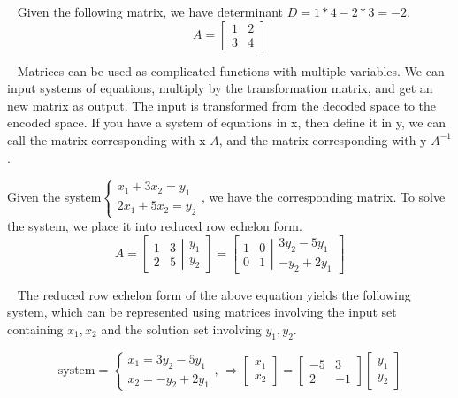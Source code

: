\documentclass[12pt]{article}
\begin{document}
$\,\,\,$ Given the following matrix, we have determinant $D=1*4-2*3=-2$.
$$A=\begin{bmatrix}
1 & 2\\3 & 4
\end{bmatrix}$$

$\,\,\,$ Matrices can be used as complicated functions with multiple variables. We can input systems of equations, multiply by the transformation matrix, and get an new matrix as output. The input is transformed from the decoded space to the encoded space. If you have a system of equations in x, then define it in y, we can call the matrix corresponding with x $A$, and the matrix corresponding with y $A^{-1}$.

Given the system$\left\lbrace\begin{matrix}
x_1+3x_2=y_1\\2x_1+5x_2=y_2
\end{matrix}\right.$, we have the corresponding matrix. To solve the system, we place it into reduced row echelon form.
$$A=\left[\left.\begin{matrix}
1 & 3\\2 & 5
\end{matrix}\right|\begin{matrix}
y_1\\y_2
\end{matrix}\right]=
\left[\left.\begin{matrix}
1 & 0\\0 & 1
\end{matrix}\right|\begin{matrix}
3y_2-5y_1\\-y_2+2y_1
\end{matrix}\right]$$

$\,\,\,$ The reduced row echelon form of the above equation yields the following system, which can be represented using matrices involving the input set containing $x_1,x_2$ and the solution set involving $y_1,y_2$.

$$\text{system}=
\left\lbrace\begin{matrix}
x_1=3y_2-5y_1\\ x_2=-y_2+2y_1
\end{matrix}\right. ,\,\Rightarrow \begin{bmatrix}
x_1\\x_2
\end{bmatrix}
=\begin{bmatrix}
-5 & 3\\ 2 & -1
\end{bmatrix}
\begin{bmatrix}
y_1\\y_2
\end{bmatrix}
$$
\end{document}
